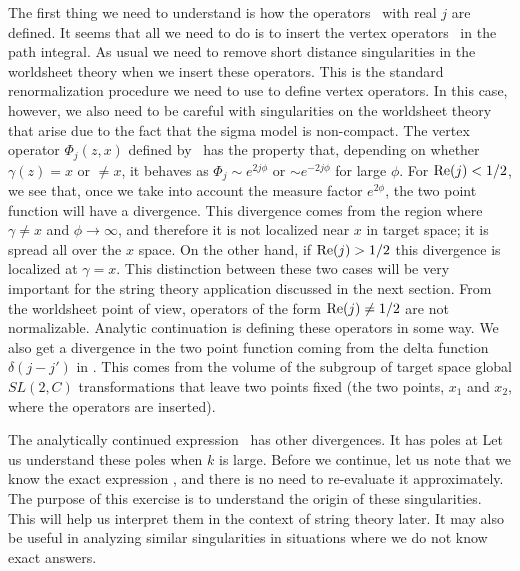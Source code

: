 The first thing we need to understand is
how the operators \operators\ with
real $j$ are defined. It seems that all we need to do is to insert
the vertex operators \operators\ in the path integral.
As usual we need to remove short distance singularities in the
worldsheet theory when we insert these operators. This is the
standard renormalization procedure we need to use to define vertex
operators. In this case, however,
 we also need to be careful with singularities
on the worldsheet theory that arise due to the fact that the
sigma model is non-compact.
The vertex operator $\Phi_j(z,x)$ defined by \operators\
has the property that, depending on whether $\gamma(z)=x$
or $\neq x$, it behaves as $\Phi_j \sim e^{2j\phi}$ or
$\sim e^{-2j\phi}$ for large $\phi$.
For ${\rm Re}(j) <1/2$, we see that, once we take into
account the measure factor $e^{2 \phi}$, the two point
function
will have a divergence. This divergence comes from the region
where $\gamma \not =x$ and $\phi \rightarrow \infty$,
 and therefore it is not localized near
$x$ in target space; it is spread all over the $x$ space.
On the other hand, if ${\rm Re}(j)>1/2$ this divergence is
localized at $\gamma =x$. This distinction between these
two cases will be very important for
the string theory application discussed in the next section.
{} From the worldsheet point of
view, operators of the form ${\rm Re}(j) \not =1/2$ are not normalizable.
Analytic continuation is defining  these  operators in some way.
We also get a divergence in the two point function coming from the
delta function $\delta (j-j')$ in \teschnertwo.
 This comes from the volume of the
subgroup of target space global
$SL(2,C)$ transformations that leave two points fixed
(the two points, $x_1$ and $x_2$, where the operators are inserted).


The analytically continued expression \
has  other divergences. It
has poles at
\eqn{}
Let us understand these poles when $k$ is large.
 Before we continue,
let us note that we know the exact expression \teschnertwo, and
there is no need to re-evaluate it approximately. The purpose
of this exercise is to understand the origin of these
singularities. This will help us interpret them in
the context of string theory later. It
may also be useful in analyzing
similar singularities in situations where we do not know
exact answers.


